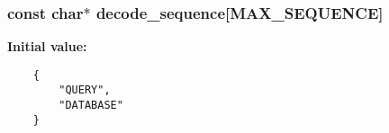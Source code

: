 \subsubsection{\setlength{\rightskip}{0pt plus 5cm}const char$\ast$ \bf{decode\_\-sequence}[MAX\_\-SEQUENCE]\hspace{0.3cm}{\tt  [static]}}\label{hist__params_8c_9291df9cc8e8a43995640243fc3e2807}


\textbf{Initial value:}

\begin{Code}\begin{verbatim}
    {
        "QUERY",
        "DATABASE"
    }
\end{verbatim}\end{Code}

